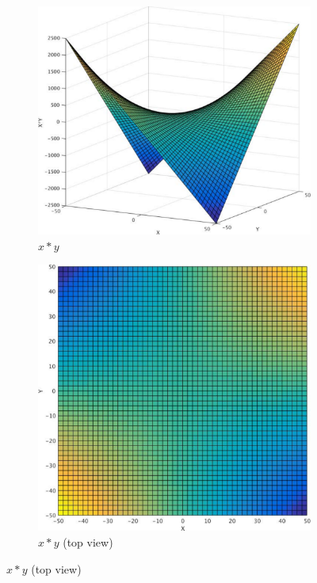 \vspace*{50px}
\begin{figure}[ht!]
\begin{subfigure}{.5\textwidth}
  \centering
  \includegraphics[width=.9\linewidth]{./figures/phdWork_MFunc_a.pdf}
  \caption{$x \ast y$}
  \label{fig:sfig1}
\end{subfigure}%
\begin{subfigure}{.5\textwidth}
  \centering
  \includegraphics[width=.9\linewidth]{./figures/phdWork_MFunc_b.pdf}
  \caption{$x \ast y$ (top view)}
  \label{fig:sfig2}
\end{subfigure}

\end{figure}

